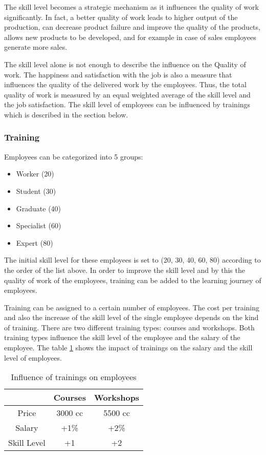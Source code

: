 The skill level becomes a strategic mechanism as it influences the quality of work significantly. In fact, a better quality of work leads to higher output of the production, can decrease product failure and improve the quality of the products, allows new products to be developed, and for example in case of sales employees generate more sales. 

The skill level alone is not enough to describe the influence on the Quality of work. The happiness and satisfaction with the job is also a measure that influences the quality of the delivered work by the employees.
Thus, the total quality of work is measured by an equal weighted average of the skill level and the job satisfaction. The skill level of employees can be influenced by trainings which is described in the section below.

\subsubsection{Training}
Employees can be categorized into 5 groups:
\begin{itemize}
    \item Worker (20)
    \item Student (30)
    \item Graduate (40)
    \item Specialist (60)
    \item Expert (80)
\end{itemize}
The initial skill level for these employees is set to (20, 30, 40, 60, 80) according to the order of the list above. In order to improve the skill level and by this the quality of work of the employees, training can be added to the learning journey of employees. 

Training can be assigned to a certain number of employees. The cost per training and also the increase of the skill level of the single employee depends on the kind of training. There are two different training types: courses and workshops. Both training types influence the skill level of the employee and the salary of the employee. The  table \ref{tab:trainings_employees} shows the impact of trainings on the salary and the skill level of employees.

\begin{table}
    \centering
\begin{tabular}{c|c|c}
    \hline
     & \textbf{Courses} & \textbf{Workshops} \\
     \hline \hline
     Price & 3000 cc & 5500 cc \\
     Salary & +1\% & +2\%  \\
     Skill Level & +1 & +2  \\
     \hline
\end{tabular}
\caption{Influence of trainings on employees}
    \label{tab:trainings_employees}
\end{table}


